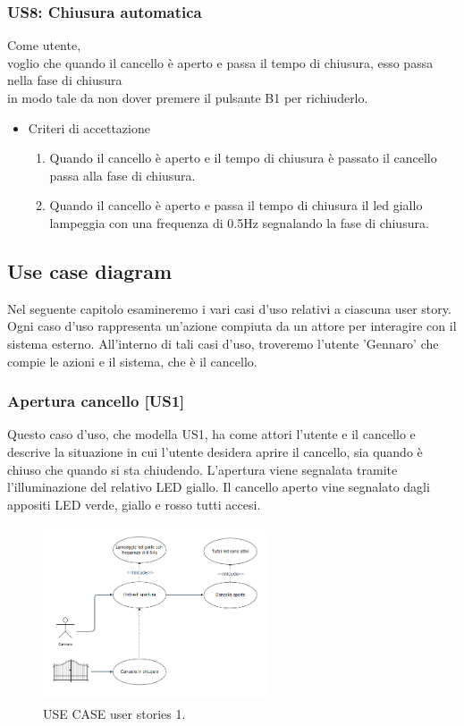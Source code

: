 \documentclass[12pt]{article}
\begin{document}
\subsubsection{US8: Chiusura automatica}
Come utente, \\
voglio che quando il cancello è aperto e passa il tempo di chiusura, esso passa nella fase di chiusura\\
in modo tale da non dover premere il pulsante B1 per richiuderlo.
\begin{itemize}
    \item Criteri di accettazione
    \begin{enumerate}
        \item Quando il cancello è aperto e il tempo di chiusura è passato il cancello passa alla fase di chiusura.
        \item Quando il cancello è aperto e passa il tempo di chiusura il led giallo lampeggia con una frequenza di 0.5Hz segnalando la fase di chiusura.
    \end{enumerate}
\end{itemize}

\newpage



\subsection{Use case diagram}
Nel seguente capitolo esamineremo i vari casi d'uso relativi a ciascuna user story. Ogni caso d'uso rappresenta un'azione compiuta da un attore per interagire con il sistema esterno. All'interno di tali casi d'uso, troveremo l'utente 'Gennaro' che compie le azioni e il sistema, che è il cancello.

\subsubsection{Apertura cancello [US1]}
Questo caso d'uso, che modella US1, ha come attori l'utente e il cancello e descrive la situazione in cui l'utente desidera aprire il cancello, sia quando è chiuso che quando si sta chiudendo. L'apertura viene segnalata tramite l'illuminazione del relativo LED giallo. Il cancello aperto vine segnalato dagli appositi LED verde, giallo e rosso tutti accesi.
\begin{figure}[h]
    \centering
    \includegraphics[width=0.6\textwidth,height=5.2cm]{use_case_us1.PNG}
    \caption{USE CASE user stories 1.}
    \label{fig:use_case_us5}
\end{figure}
\end{document}
